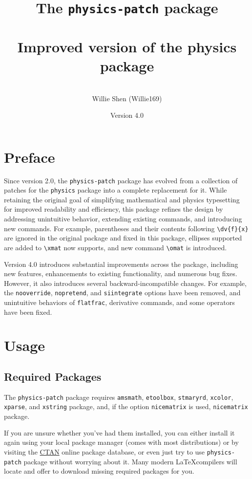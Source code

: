 \documentclass[a4paper,12pt]{article}
\title{The \texttt{physics-patch} package\\\mbox{}\\\textnormal{\large Improved version of the physics package}}
\author{\mbox{}\\Willie Shen (Willie169)}
\date{Version 4.0}
\renewcommand{\maketitle}{
\begin{titlepage}
\begin{center}
\vspace*{\fill}
{\huge \bfseries \thetitle\par}
\vskip 1.5em
{\Large \theauthor\par}
\vskip 1em
{\large \thedate\par}
\vspace*{\fill}
\end{center}
\end{titlepage}
}
\begin{document}
\onehalfspacing\thispagestyle{empty}\Needspace{1\textheight}\maketitle\setcounter{page}{1}\Needspace{1\textheight}\tableofcontents\Needspace{1\textheight}\setcounter{page}{1}
\section{Preface}
Since version 2.0, the \texttt{physics-patch} package has evolved from a collection of patches for the \texttt{physics} package into a complete replacement for it. While retaining the original goal of simplifying mathematical and physics typesetting for improved readability and efficiency, this package refines the design by addressing unintuitive behavior, extending existing commands, and introducing new commands. For example, parentheses and their contents following \verb|\dv{f}{x}| are ignored in the original package and fixed in this package, ellipses supported are added to \verb|\xmat| now supports, and new command \verb|\omat| is introduced.

Version 4.0 introduces substantial improvements across the package, including new features, enhancements to existing functionality, and numerous bug fixes. However, it also introduces several backward-incompatible changes. For example, the \texttt{nooverride}, \texttt{nopretend}, and \verb|siintegrate| options have been removed, and unintuitive behaviors of \texttt{flatfrac}, derivative commands, and some operators have been fixed.
\section{Usage}
\subsection{Required Packages}
The \texttt{physics-patch} package requires \texttt{amsmath}, \texttt{etoolbox}, \texttt{stmaryrd}, \texttt{xcolor}, \texttt{xparse}, and \texttt{xstring} package, and, if the option \texttt{nicematrix} is used, \texttt{nicematrix} package.

If you are unsure whether you've had them installed, you can either install it again using your local package manager (comes with most distributions) or by visiting the \href{http://www.ctan.org}{CTAN} online package database, or even just try to use \texttt{physics-patch} package without worrying about it. Many modern \LaTeX compilers will locate and offer to download missing required packages for you.
\end{document}
